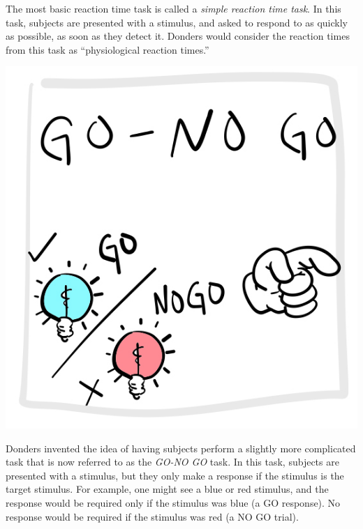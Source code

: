 \documentclass[
  oneside,
  12pt]{crumpbook}
\newenvironment{floatright25}{%
  \wrapfigure{R}{.25\textwidth}%
  }{%
  \endwrapfigure}
\begin{document}
The most basic reaction time task is called a \emph{simple reaction time task}. In this task, subjects are presented with a stimulus, and asked to respond to as quickly as possible, as soon as they detect it. Donders would consider the reaction times from this task as ``physiological reaction times.''

\begin{floatright25}
\includegraphics[width=1\linewidth]{imgs/Donders_GoNoGo}

\end{floatright25}

Donders invented the idea of having subjects perform a slightly more complicated task that is now referred to as the \emph{GO-NO GO} task. In this task, subjects are presented with a stimulus, but they only make a response if the stimulus is the target stimulus. For example, one might see a blue or red stimulus, and the response would be required only if the stimulus was blue (a GO response). No response would be required if the stimulus was red (a NO GO trial).
\end{document}
